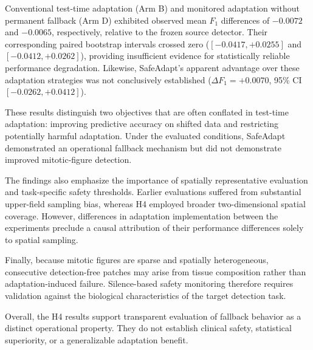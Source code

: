 \documentclass[conference]{IEEEtran}
\begin{document}
Conventional test-time adaptation (Arm B) and monitored adaptation without permanent fallback (Arm D) exhibited observed mean $F_1$ differences of $-0.0072$ and $-0.0065$, respectively, relative to the frozen source detector.
Their corresponding paired bootstrap intervals crossed zero ($[-0.0417, +0.0255]$ and $[-0.0412, +0.0262]$), providing insufficient evidence for statistically reliable performance degradation.
Likewise, SafeAdapt's apparent advantage over these adaptation strategies was not conclusively established ($\Delta F_1 = +0.0070$, 95\% CI $[-0.0262, +0.0412]$).

These results distinguish two objectives that are often conflated in test-time adaptation: improving predictive accuracy on shifted data and restricting potentially harmful adaptation.
Under the evaluated conditions, SafeAdapt demonstrated an operational fallback mechanism but did not demonstrate improved mitotic-figure detection.

The findings also emphasize the importance of spatially representative evaluation and task-specific safety thresholds.
Earlier evaluations suffered from substantial upper-field sampling bias, whereas H4 employed broader two-dimensional spatial coverage.
However, differences in adaptation implementation between the experiments preclude a causal attribution of their performance differences solely to spatial sampling.

Finally, because mitotic figures are sparse and spatially heterogeneous, consecutive detection-free patches may arise from tissue composition rather than adaptation-induced failure.
Silence-based safety monitoring therefore requires validation against the biological characteristics of the target detection task.

Overall, the H4 results support transparent evaluation of fallback behavior as a distinct operational property.
They do not establish clinical safety, statistical superiority, or a generalizable adaptation benefit.
\end{document}
